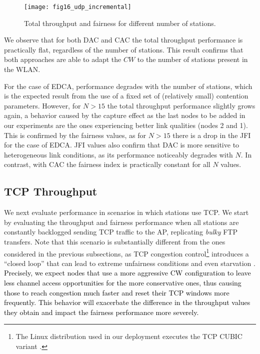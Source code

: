 \documentclass[a4paper,10pt]{article}
\newcommand{\revs}[1]{\textcolor{black}{#1}}
\begin{document}
\begin{figure}\texttt{[image: fig16\_udp\_incremental]}\caption{Total throughput and fairness for different number of stations.}\label{fig:throughput_n}\end{figure}


We observe that for both DAC and CAC the total throughput performance is practically flat, regardless of the number of stations. This result confirms that both approaches are able to adapt the $CW$ to the number of stations present in the WLAN.

For the case of EDCA, performance degrades with the number of stations, which is the expected result from the use of a fixed set of (relatively small) contention parameters. However, for $N > 15$ the total throughput performance slightly grows again, a behavior caused by the capture effect as the last nodes to be added in our experiments are the ones experiencing better link qualities (nodes 2 and 1). This is confirmed by the fairness values, as for $N > 15$ there is a drop in the JFI for the case of EDCA. JFI values also confirm that DAC is more sensitive to heterogeneous link conditions, as its performance noticeably degrades with $N$. In contrast, with CAC the fairness index is practically constant for all $N$ values. 

\vspace{0.5em}
\subsection{TCP Throughput}

We next evaluate performance in scenarios in which stations use TCP. We start by evaluating the throughput and fairness performance when all stations are constantly backlogged sending TCP traffic to the AP, replicating \emph{bulky} FTP transfers. Note that this scenario is substantially different from the ones considered in the previous subsections, as TCP congestion control\footnote{The Linux distribution used in our deployment executes the TCP CUBIC variant \cite{ha08}.} introduces a ``closed loop'' that can lead to extreme unfairness conditions and even starvation \cite{gurewitz}. \revs{Precisely, we expect nodes that use a more aggressive CW configuration to leave less channel access opportunities for the more conservative ones, thus causing those to reach congestion much faster and reset their TCP windows more frequently. This behavior will exacerbate the difference in the throughput values they obtain and impact the fairness performance more severely.}
\end{document}
